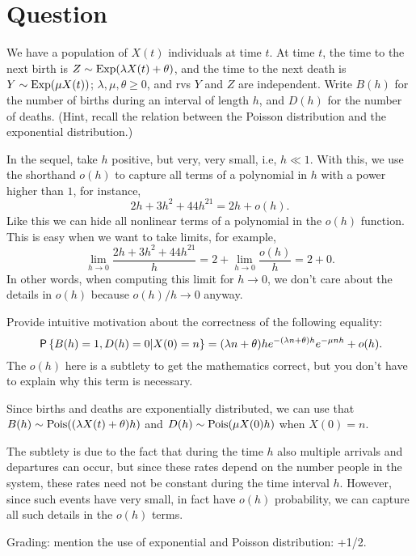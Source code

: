 \section{Question}


We have a population of $X(t)$ individuals at time $t$. At time $t$, the time to the next birth is $Z\sim\Exp{\lambda X(t)+\theta}$, and the time to the next death is $Y\sim \Exp{\mu X(t)}$; $\lambda, \mu, \theta \geq 0$, and  rvs $Y$ and $Z$ are independent. Write $B(h)$ for the number of births during an interval of length $h$, and $D(h)$ for the number of deaths. (Hint, recall the relation between the Poisson distribution and the exponential distribution.)

In the sequel, take $h$ positive, but very, very small, i.e, $h\ll 1$. With this, we use the shorthand $o(h)$ to capture all terms of a polynomial in $h$ with a power higher than $1$, for instance,
\begin{equation}
  2h + 3 h^2+ 44 h^{21} = 2h + o(h).
\end{equation}
Like this we can hide all nonlinear terms of a polynomial in the $o(h)$ function. This is easy when we want to take limits, for example,
\begin{equation}
  \lim_{h\to 0} \frac{2h + 3h^{2} + 44 h^{21}} h
= 2 +  \lim_{h\to 0} \frac{o(h)} h  = 2 + 0.
\end{equation}
In other words, when computing this limit for $h\to 0$, we don't care about the details in $o(h)$ because $o(h)/h\to0$ anyway.

\begin{exercise}[1]
Provide intuitive motivation about the correctness of the following equality:
\begin{equation}
\P{B(h)=1, D(h)=0|X(0) = n } = (\lambda n  +\theta) h e^{-(\lambda n+\theta)h} e^{-\mu n h} + o(h).
\end{equation}
The $o(h)$ here is a subtlety to get the mathematics correct, but you  don't have to explain why this term is necessary.
\begin{solution}
Since births and deaths  are exponentially distributed, we can use that $B(h) \sim \Pois{(\lambda X(t) + \theta)h}$ and $D(h) \sim \Pois{\mu X(0) h}$ when $X(0) = n$.

The subtlety is due to the fact that  during the time $h$ also multiple arrivals and  departures  can occur, but since these rates depend on the number people in the system, these rates need not be constant during the time interval $h$.
However, since such events have very small, in fact have $o(h)$ probability, we can capture all such details in the $o(h)$ terms.

Grading: mention the use of exponential and Poisson distribution: +1/2.
\end{solution}
\end{exercise}

